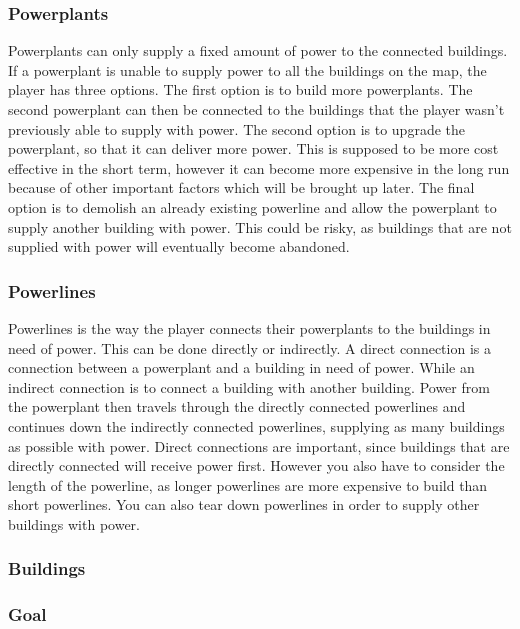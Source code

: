 \subsubsection*{Powerplants}
Powerplants can only supply a fixed amount of power to the connected buildings. If a powerplant is 
unable to supply power to all the buildings on the map, the player has three options. The first option 
is to build more powerplants. The second powerplant can then be connected to the buildings that the
player wasn't previously able to supply with power. The second option is to upgrade the powerplant,
so that it can deliver more power. This is supposed to be more cost effective in the short term, however
it can become more expensive in the long run because of other important factors which will be brought
up later. The final option is to demolish an already existing powerline and allow the powerplant to
supply another building with power. This could be risky, as buildings that are not supplied with power
will eventually become abandoned.

\subsubsection*{Powerlines}
Powerlines is the way the player connects their powerplants to the buildings in need of power. This 
can be done directly or indirectly. A direct connection is a connection between a powerplant and a 
building in need of power. While an indirect connection is to connect a building with another building.
Power from the powerplant then travels through the directly connected powerlines and continues down 
the indirectly connected powerlines, supplying as many buildings as possible with power. Direct 
connections are important, since buildings that are directly connected will receive power first.
However you also have to consider the length of the powerline, as longer powerlines are more expensive
to build than short powerlines. You can also tear down powerlines in order to supply other buildings
with power.

\subsubsection*{Buildings}

\subsubsection*{Goal}

